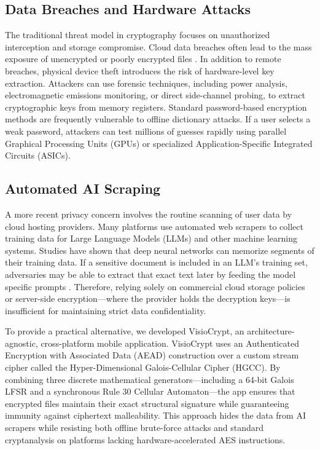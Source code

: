 \documentclass[runningheads]{llncs}
\begin{document}
\subsection{Data Breaches and Hardware Attacks}
The traditional threat model in cryptography focuses on unauthorized interception and storage compromise. Cloud data breaches often lead to the mass exposure of unencrypted or poorly encrypted files \cite{shokri2015}. In addition to remote breaches, physical device theft introduces the risk of hardware-level key extraction. Attackers can use forensic techniques, including power analysis, electromagnetic emissions monitoring, or direct side-channel probing, to extract cryptographic keys from memory registers. Standard password-based encryption methods are frequently vulnerable to offline dictionary attacks. If a user selects a weak password, attackers can test millions of guesses rapidly using parallel Graphical Processing Units (GPUs) or specialized Application-Specific Integrated Circuits (ASICs).

\subsection{Automated AI Scraping}
A more recent privacy concern involves the routine scanning of user data by cloud hosting providers. Many platforms use automated web scrapers to collect training data for Large Language Models (LLMs) and other machine learning systems. Studies have shown that deep neural networks can memorize segments of their training data. If a sensitive document is included in an LLM's training set, adversaries may be able to extract that exact text later by feeding the model specific prompts \cite{carlini2021}. Therefore, relying solely on commercial cloud storage policies or server-side encryption---where the provider holds the decryption keys---is insufficient for maintaining strict data confidentiality.

To provide a practical alternative, we developed VisioCrypt, an architecture-agnostic, cross-platform mobile application. VisioCrypt uses an Authenticated Encryption with Associated Data (AEAD) construction over a custom stream cipher called the Hyper-Dimensional Galois-Cellular Cipher (HGCC). By combining three discrete mathematical generators---including a 64-bit Galois LFSR and a synchronous Rule 30 Cellular Automaton---the app ensures that encrypted files maintain their exact structural signature while guaranteeing immunity against ciphertext malleability. This approach hides the data from AI scrapers while resisting both offline brute-force attacks and standard cryptanalysis on platforms lacking hardware-accelerated AES instructions.
\end{document}
